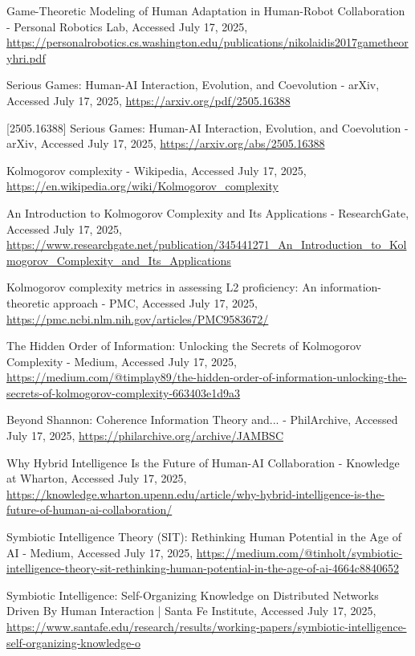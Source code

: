 \documentclass[10pt,twocolumn]{article}
\begin{document}
\begin{thebibliography}{68}
Game-Theoretic Modeling of Human Adaptation in Human-Robot Collaboration - Personal Robotics Lab, Accessed July 17, 2025, \url{https://personalrobotics.cs.washington.edu/publications/nikolaidis2017gametheoryhri.pdf}

Serious Games: Human-AI Interaction, Evolution, and Coevolution - arXiv, Accessed July 17, 2025, \url{https://arxiv.org/pdf/2505.16388}

[2505.16388] Serious Games: Human-AI Interaction, Evolution, and Coevolution - arXiv, Accessed July 17, 2025, \url{https://arxiv.org/abs/2505.16388}

Kolmogorov complexity - Wikipedia, Accessed July 17, 2025, \url{https://en.wikipedia.org/wiki/Kolmogorov_complexity}

An Introduction to Kolmogorov Complexity and Its Applications - ResearchGate, Accessed July 17, 2025, \url{https://www.researchgate.net/publication/345441271_An_Introduction_to_Kolmogorov_Complexity_and_Its_Applications}

Kolmogorov complexity metrics in assessing L2 proficiency: An information-theoretic approach - PMC, Accessed July 17, 2025, \url{https://pmc.ncbi.nlm.nih.gov/articles/PMC9583672/}

The Hidden Order of Information: Unlocking the Secrets of Kolmogorov Complexity - Medium, Accessed July 17, 2025, \url{https://medium.com/@timplay89/the-hidden-order-of-information-unlocking-the-secrets-of-kolmogorov-complexity-663403e1d9a3}

Beyond Shannon: Coherence Information Theory and... - PhilArchive, Accessed July 17, 2025, \url{https://philarchive.org/archive/JAMBSC}

Why Hybrid Intelligence Is the Future of Human-AI Collaboration - Knowledge at Wharton, Accessed July 17, 2025, \url{https://knowledge.wharton.upenn.edu/article/why-hybrid-intelligence-is-the-future-of-human-ai-collaboration/}

Symbiotic Intelligence Theory (SIT): Rethinking Human Potential in the Age of AI - Medium, Accessed July 17, 2025, \url{https://medium.com/@tinholt/symbiotic-intelligence-theory-sit-rethinking-human-potential-in-the-age-of-ai-4664c8840652}

Symbiotic Intelligence: Self-Organizing Knowledge on Distributed Networks Driven By Human Interaction | Santa Fe Institute, Accessed July 17, 2025, \url{https://www.santafe.edu/research/results/working-papers/symbiotic-intelligence-self-organizing-knowledge-o}


\end{thebibliography}
\end{document}
